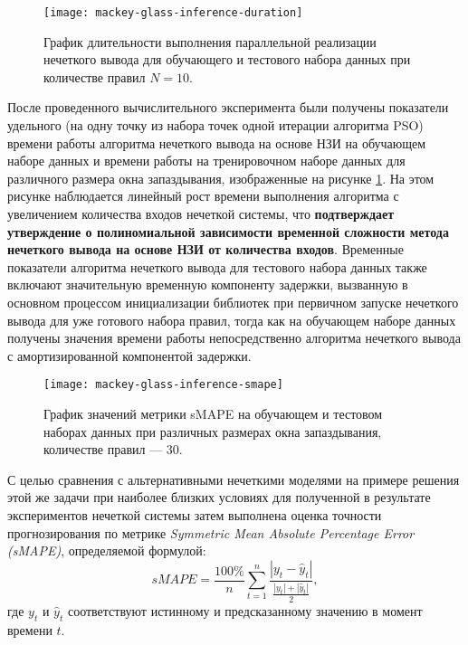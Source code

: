 \begin{figure}
	\centering
	\texttt{[image: mackey-glass-inference-duration]}
	\caption{График длительности выполнения параллельной реализации нечеткого вывода для обучающего и тестового набора данных при количестве правил $N=10$.}
	\label{fig:mackey-glass-inference-duration}
\end{figure}

После проведенного вычислительного эксперимента были получены показатели удельного (на одну точку из набора точек одной итерации алгоритма PSO) времени работы алгоритма нечеткого вывода на основе НЗИ на обучающем наборе данных и времени работы на тренировочном наборе данных для различного размера окна запаздывания, изображенные на рисунке \cref{fig:mackey-glass-inference-duration}. На этом рисунке наблюдается линейный рост времени выполнения алгоритма с увеличением количества входов нечеткой системы, что \textbf{подтверждает утверждение о полиномиальной зависимости временной сложности метода нечеткого вывода на основе НЗИ от количества входов}. Временные показатели алгоритма нечеткого вывода для тестового набора данных также включают значительную временную компоненту задержки, вызванную в основном процессом инициализации библиотек при первичном запуске нечеткого вывода для уже готового набора правил, тогда как на обучающем наборе данных получены значения времени работы непосредственно алгоритма нечеткого вывода с амортизированной компонентой задержки.

\begin{figure}
	\centering
	\texttt{[image: mackey-glass-inference-smape]}
	\caption{График значений метрики sMAPE на обучающем и тестовом наборах данных при различных размерах окна запаздывания, количестве правил --- 30.}
	\label{fig:mackey-glass-inference-smape}
\end{figure}

С целью сравнения с альтернативными нечеткими моделями на примере решения этой же задачи при наиболее близких условиях для полученной в результате экспериментов нечеткой системы затем выполнена оценка точности прогнозирования по метрике \textit{Symmetric Mean Absolute Percentage Error (sMAPE)}, определяемой формулой:
\[
sMAPE = \frac{100\%}{n} \sum_{t=1}^n 
\frac{|y_t - \hat{y}_t|}{\tfrac{|y_t| + |\hat{y}_t|}{2}},
\]
где $y_t$ и $\hat{y}_t$ соответствуют истинному и предсказанному значению в момент времени $t$.




